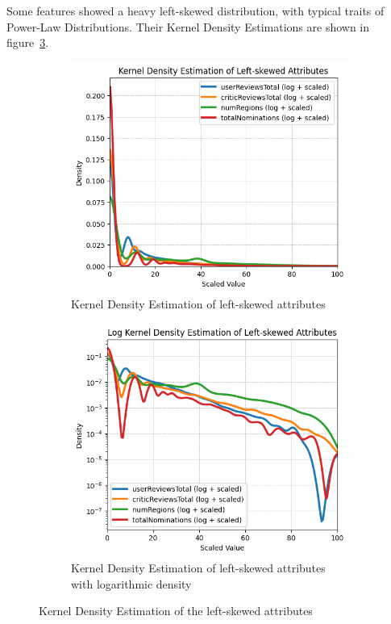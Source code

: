 Some features showed a heavy left-skewed distribution, with typical traits of Power-Law Distributions. Their Kernel Density Estimations are shown in figure~\ref{fig:left_skewed}.
\begin{figure}[H]
    \centering
    \begin{subfigure}{0.48\textwidth}
        \includegraphics[width=\textwidth]{plots/left_skew_distribs.png}
        \captionsetup{width=0.9\linewidth, justification=centering}
        \caption{Kernel Density Estimation of left-skewed attributes}
        \label{fig:sub1_KDE_left_skew}
    \end{subfigure}
    \begin{subfigure}{0.48\textwidth}
        \includegraphics[width=\textwidth]{plots/left_skew_distribs_log.png}
        \captionsetup{width=0.9\linewidth, justification=centering}
        \caption{Kernel Density Estimation of left-skewed attributes with logarithmic density}
        \label{fig:sub2_KDE_left_skew}
    \end{subfigure}
    \caption{Kernel Density Estimation of the left-skewed attributes}
    \label{fig:left_skewed}
\end{figure}

